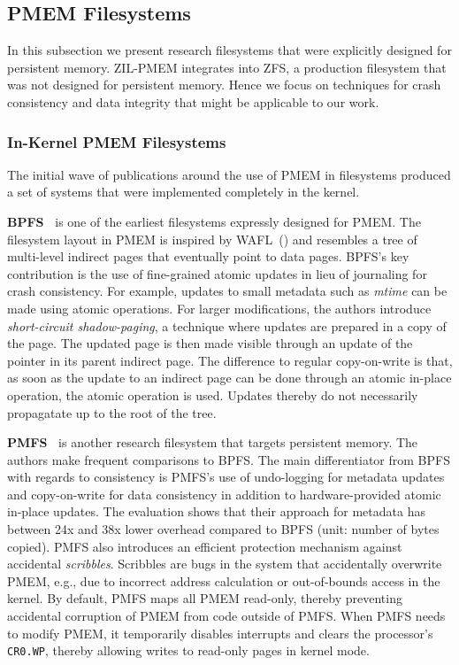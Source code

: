\documentclass[12pt,a4paper,twoside]{book}
\begin{document}
\subsection{PMEM Filesystems}
In this subsection we present research filesystems that were explicitly designed for persistent memory.
ZIL-PMEM integrates into ZFS, a production filesystem that was not designed for persistent memory.
Hence we focus on techniques for crash consistency and data integrity that might be applicable to our work.

\subsubsection{In-Kernel PMEM Filesystems}\label{sec:in_kernel_pmem_filesystems}
The initial wave of publications around the use of PMEM in filesystems produced a set of systems that were implemented completely in the kernel.

\newcommand{\citerelwork}[2]{\textbf{#1~\cite{#2}}}

\citerelwork{BPFS}{conditBetterByteaddressablePersistent2009} is one of the earliest filesystems expressly designed for PMEM.
The filesystem layout in PMEM is inspired by WAFL~(\cite{hitzFileSystemDesign1994}) and resembles a tree of multi-level indirect pages that eventually point to data pages.
BPFS’s key contribution is the use of fine-grained atomic updates in lieu of journaling for crash consistency.
For example, updates to small metadata such as \textit{mtime} can be made using atomic operations.
For larger modifications, the authors introduce \textit{short-circuit shadow-paging}, a technique where updates are prepared in a copy of the page.
The updated page is then made visible through an update of the pointer in its parent indirect page.
The difference to regular copy-on-write is that, as soon as the update to an indirect page can be done through an atomic in-place operation, the atomic operation is used.
Updates thereby do not necessarily propagatate up to the root of the tree.

\citerelwork{PMFS}{dulloorSystemSoftwarePersistent2014} is another research filesystem that targets persistent memory.
The authors make frequent comparisons to BPFS.
The main differentiator from BPFS with regards to consistency is PMFS’s use of undo-logging for metadata updates and copy-on-write for data consistency in addition to hardware-provided atomic in-place updates.
The evaluation shows that their approach for metadata has between 24x and 38x lower overhead compared to BPFS (unit: number of bytes copied).
PMFS also introduces an efficient protection mechanism against accidental \textit{scribbles}.
Scribbles are bugs in the system that accidentally overwrite PMEM, e.g., due to incorrect address calculation or out-of-bounds access in the kernel.
By default, PMFS maps all PMEM read-only, thereby preventing accidental corruption of PMEM from code outside of PMFS.
When PMFS needs to modify PMEM, it temporarily disables interrupts and clears the processor's \lstinline{CR0.WP}, thereby allowing writes to read-only pages in kernel mode.~\cite{dulloorSystemSoftwarePersistent2014,intelSdmCr0WpFlag}
\end{document}

